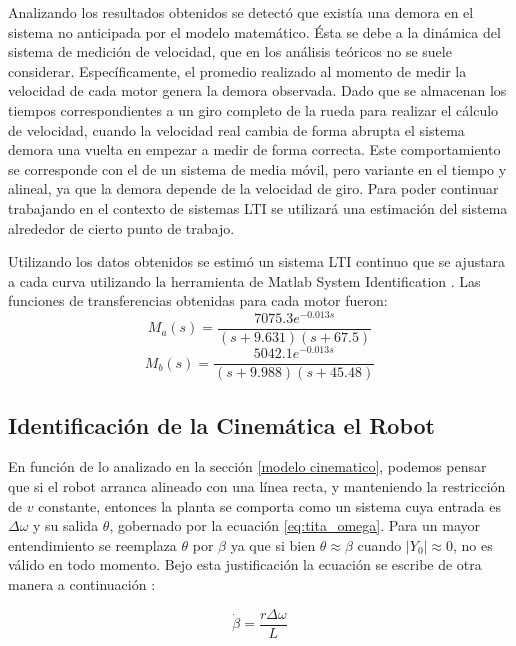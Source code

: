 \documentclass[10pt,conference,a4paper,onecolumn]{article}%
\begin{document}
Analizando los resultados obtenidos se detectó que existía una demora en el sistema no anticipada por el modelo matemático. Ésta se debe a la dinámica del sistema de medición de velocidad, que en los análisis teóricos no se suele considerar. Específicamente, el promedio realizado al momento de medir la velocidad de cada motor genera la demora observada. Dado que se almacenan los tiempos correspondientes a un giro completo de la rueda  para realizar el cálculo de velocidad, cuando la velocidad real cambia de forma abrupta el sistema demora una vuelta en empezar a medir de forma correcta. Este comportamiento se corresponde con el de un sistema de media móvil, pero variante en el tiempo y alineal, ya que la demora depende de la velocidad de giro. Para poder continuar trabajando en el contexto de sistemas LTI se utilizará una estimación del sistema alrededor de cierto punto de trabajo. 

Utilizando los datos obtenidos se estimó un sistema LTI continuo que se ajustara a cada curva utilizando la herramienta de Matlab System Identification \cite{Sys_ident}. Las funciones de transferencias obtenidas para cada motor fueron:
\begin{equation}
M_a(s)= \frac{7075.3 e^{-0.013s}}{(s+9.631)(s+67.5)}
\end{equation}
\begin{equation}
M_b(s)= \frac{5042.1 e^{-0.013s}}{(s+9.988) (s+45.48)}
\end{equation}

\subsection{Identificación de la Cinemática el Robot}
En función de lo analizado en la sección \ref{modelo cinematico}, podemos pensar que si el robot arranca alineado con una línea recta, y manteniendo la restricción de $v$ constante, entonces la planta se comporta como un sistema cuya entrada es $\Delta \omega$ y su salida $\theta$, gobernado por la ecuación \ref{eq:tita_omega}. Para un mayor entendimiento se reemplaza $\theta$ por $\beta$ ya que si bien $\theta \approx \beta $ cuando $|Y_0| \approx 0$, no es válido en todo momento. Bejo esta justificación la ecuación se escribe de otra manera a continuación :

\begin{equation}
\dot{\beta}= \frac{r\Delta\omega}{L} 
\label{eq:sys_tot_teo} 
\end{equation}
\end{document}
